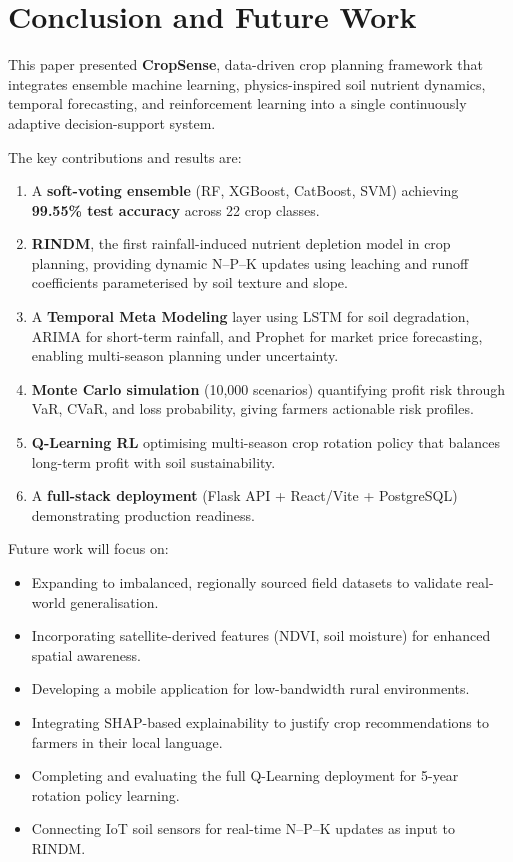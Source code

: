 \documentclass[conference]{IEEEtran}
\begin{document}
\section{Conclusion and Future Work}
\label{sec:conclusion}

This paper presented \textbf{CropSense}, data-driven crop
planning framework that integrates ensemble machine learning, physics-inspired
soil nutrient dynamics, temporal forecasting, and reinforcement learning
into a single continuously adaptive decision-support system.

The key contributions and results are:
\begin{enumerate}
  \item A \textbf{soft-voting ensemble} (RF, XGBoost, CatBoost, SVM)
        achieving \textbf{99.55\% test accuracy} across 22 crop classes.
  \item \textbf{RINDM}, the first rainfall-induced nutrient depletion model
        in crop planning, providing dynamic N--P--K updates using leaching
        and runoff coefficients parameterised by soil texture and slope.
  \item A \textbf{Temporal Meta Modeling} layer using LSTM for soil
        degradation, ARIMA for short-term rainfall, and Prophet for market
        price forecasting, enabling multi-season planning under uncertainty.
  \item \textbf{Monte Carlo simulation} (10,000 scenarios) quantifying
        profit risk through VaR, CVaR, and loss probability, giving
        farmers actionable risk profiles.
  \item \textbf{Q-Learning RL} optimising multi-season crop rotation
        policy that balances long-term profit with soil sustainability.
  \item A \textbf{full-stack deployment} (Flask API + React/Vite + PostgreSQL)
        demonstrating production readiness.
\end{enumerate}

Future work will focus on:
\begin{itemize}
  \item Expanding to imbalanced, regionally sourced field datasets
        to validate real-world generalisation.
  \item Incorporating satellite-derived features (NDVI, soil moisture)
        for enhanced spatial awareness.
  \item Developing a mobile application for low-bandwidth rural
        environments.
  \item Integrating SHAP-based explainability to justify crop
        recommendations to farmers in their local language.
  \item Completing and evaluating the full Q-Learning deployment for
        5-year rotation policy learning.
  \item Connecting IoT soil sensors for real-time N--P--K updates
        as input to RINDM.
\end{itemize}
\end{document}
